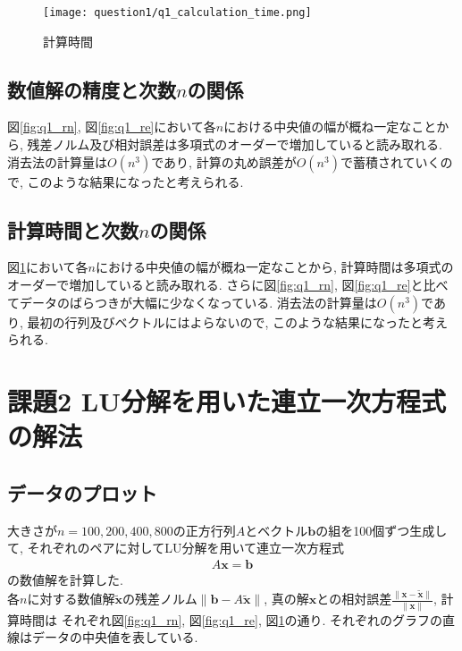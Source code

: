 \documentclass[uplatex,a4j]{jsarticle}
\begin{document}
\begin{figure}[ht]
  \centering
  \texttt{[image: question1/q1\_calculation\_time.png]}
  \caption{計算時間}
  \label{fig:q1_ct}
\end{figure}

\newpage
\subsection{数値解の精度と次数$n$の関係}
\label{sec:q1_2}
図\ref{fig:q1_rn}, 図\ref{fig:q1_re}において各$n$における中央値の幅が概ね一定なことから, 
残差ノルム及び相対誤差は多項式のオーダーで増加していると読み取れる. 
消去法の計算量は$O(n^3)$であり, 計算の丸め誤差が$O(n^3)$で蓄積されていくので, このような結果になったと考えられる.

\subsection{計算時間と次数$n$の関係}
\label{sec:q1_3}
図\ref{fig:q1_ct}において各$n$における中央値の幅が概ね一定なことから, 
計算時間は多項式のオーダーで増加していると読み取れる. 
さらに図\ref{fig:q1_rn}, 図\ref{fig:q1_re}と比べてデータのばらつきが大幅に少なくなっている.
消去法の計算量は$O(n^3)$であり, 最初の行列及びベクトルにはよらないので, このような結果になったと考えられる.


\section{課題2 LU分解を用いた連立一次方程式の解法}
\label{sec:q2}

\subsection{データのプロット}
\label{sec:q2_1}

大きさが$n = 100,200,400,800$の正方行列$A$とベクトル$\bm{b}$の組を100個ずつ生成して, 
それぞれのペアに対してLU分解を用いて連立一次方程式
\begin{align}
  A \bm{x} = \bm{b}
\end{align}
の数値解を計算した. \\
各$n$に対する数値解$\bm{\tilde{x}}$の残差ノルム$\| \bm{b} - A \bm{\tilde{x}} \|$, 
真の解$\bm{x}$との相対誤差$\frac{\| \bm{x} - \bm{\tilde{x}} \|}{\| \bm{x} \|}$, 計算時間は
それぞれ図\ref{fig:q1_rn}, 図\ref{fig:q1_re}, 図\ref{fig:q1_ct}の通り. 
それぞれのグラフの直線はデータの中央値を表している.
\end{document}
